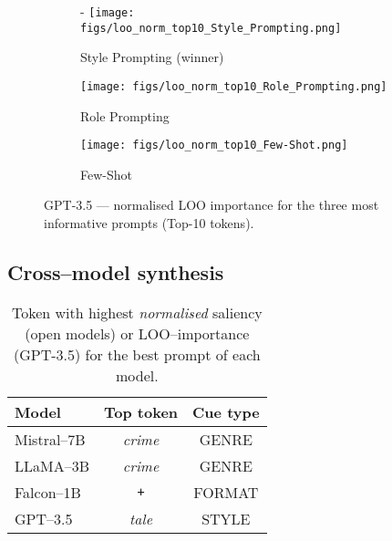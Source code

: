 \documentclass[12pt]{article}
\begin{document}
\begin{figure}[H]
  \centering
  \begin{subfigure}{0.7\linewidth}
    \centering
-    \texttt{[image: figs/loo\_norm\_top10\_Style\_Prompting.png]}
    \caption{Style Prompting (winner)}\label{fig:gpt35_style}
  \end{subfigure}\par\medskip
  \begin{subfigure}{0.7\linewidth}
    \centering
    \texttt{[image: figs/loo\_norm\_top10\_Role\_Prompting.png]}
    \caption{Role Prompting}\label{fig:gpt35_role}
  \end{subfigure}\par\medskip
  \begin{subfigure}{0.7\linewidth}
    \centering
    \texttt{[image: figs/loo\_norm\_top10\_Few-Shot.png]}
    \caption{Few-Shot}\label{fig:gpt35_few}
  \end{subfigure}
  \caption{GPT-3.5 — normalised LOO importance for the three most
           informative prompts (Top-10 tokens).}\label{fig:gpt35_bar}
\end{figure}




\subsection{Cross–model synthesis}

\begin{table}[h]
\centering
\caption{Token with highest \emph{normalised} saliency (open models) or LOO–importance (GPT-3.5) for the best prompt of each model.}
\label{tab:sal_cross}
\begin{tabular}{lcc}
\toprule
\textbf{Model} & \textbf{Top token} & \textbf{Cue type} \\
\midrule
Mistral--7B  & \textit{crime}      & GENRE \\
LLaMA--3B    & \textit{crime}      & GENRE \\
Falcon--1B   & \texttt{+}          & FORMAT\footnotemark \\
GPT--3.5     & \textit{tale}       & STYLE \\
\bottomrule
\end{tabular}
\end{table}
\end{document}
